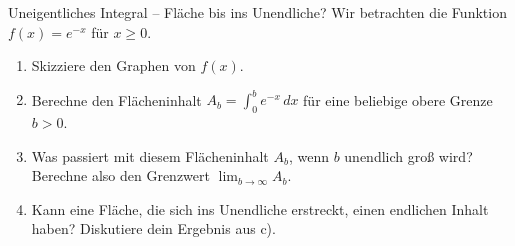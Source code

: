 \begin{aufgabenumgebung}{Uneigentliches Integral – Fläche bis ins Unendliche?}
Wir betrachten die Funktion $f(x) = e^{-x}$ für $x \ge 0$.
\begin{enumerate}
    \item Skizziere den Graphen von $f(x)$.
    \item Berechne den Flächeninhalt $A_b = \int_0^b e^{-x} \,dx$ für eine beliebige obere Grenze $b > 0$.
    \item Was passiert mit diesem Flächeninhalt $A_b$, wenn $b$ unendlich groß wird? Berechne also den Grenzwert $\lim_{b \to \infty} A_b$.
    \item Kann eine Fläche, die sich ins Unendliche erstreckt, einen endlichen Inhalt haben? Diskutiere dein Ergebnis aus c).
\end{enumerate}
\end{aufgabenumgebung}

